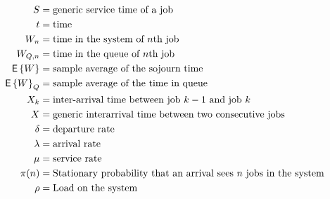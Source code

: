 \begin{align*}
  S &= \text{generic service time of a job} \\
  t &= \text{time} \\
  W_n &= \text{time in the system of $n$th job} \\
  W_{Q,n} &= \text{time in the queue of $n$th job} \\
  \,\mathsf{E}\left\{W\right\} &= \text{sample average of the sojourn time} \\
  \,\mathsf{E}\left\{W\right\}_Q &= \text{sample average of the time in queue} \\
  X_k &= \text{inter-arrival time between job $k-1$ and job  $k$} \\
  X &= \text{generic interarrival time between two consecutive jobs} \\
  \delta &= \text{departure rate} \\
  \lambda &= \text{arrival rate} \\
  \mu &= \text{service rate} \\
  \pi(n)  &= \text{Stationary probability that an arrival sees $n$ jobs in the system} \\
  \rho &= \text{Load on the system} \\
\end{align*}
